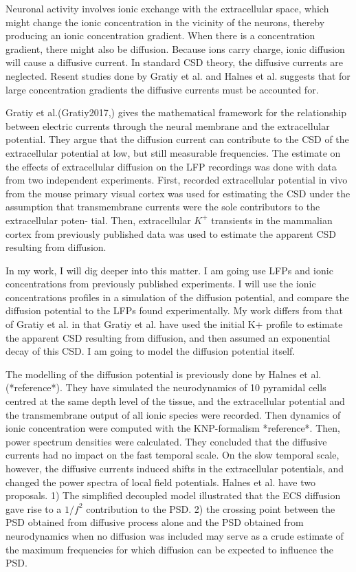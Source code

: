 \documentclass{article}
\begin{document}
Neuronal activity involves ionic exchange with the extracellular space, which might change the ionic concentration in the vicinity of the neurons, thereby producing an ionic concentration gradient. When there is a concentration gradient, there might also be diffusion. Because ions carry charge, ionic diffusion will cause a diffusive current. In standard CSD theory, the diffusive currents are neglected. Resent studies done by Gratiy et al. and Halnes et al. suggests that for large concentration gradients the diffusive currents must be accounted for. 

Gratiy et al.(Gratiy2017,) gives the mathematical framework for the relationship between electric currents through the neural membrane and the extracellular potential. They argue that the diffusion current can contribute to the CSD of the extracellular potential at low, but still measurable frequencies. The estimate on the effects of extracellular diffusion on the LFP recordings was done with data from two independent experiments. First, recorded extracellular potential in vivo from the mouse primary visual cortex was used for estimating the CSD under the assumption that transmembrane currents were the sole contributors to the extracellular poten-
tial. Then, extracellular $K^+$ transients in the mammalian cortex from previously published data was used to estimate the apparent CSD resulting from diffusion. 

In my work, I will dig deeper into this matter. I am going use LFPs and ionic concentrations from previously published experiments. I will use the ionic concentrations profiles in a simulation of the diffusion potential, and compare the diffusion potential to the LFPs found experimentally. My work differs from that of Gratiy et al. in that Gratiy et al. have used the initial K+ profile to estimate the apparent CSD resulting from diffusion, and then assumed an exponential decay of this CSD. I am going to model the diffusion potential itself. 

The modelling of the diffusion potential is previously done by Halnes et al. (*reference*). They have simulated the neurodynamics of 10 pyramidal cells centred at the same depth level of the tissue, and the extracellular potential and the transmembrane output of all ionic species were recorded. Then  dynamics of ionic concentration were computed with the KNP-formalism *reference*. Then, power spectrum densities were calculated. They concluded that the diffusive currents had no impact on the fast temporal scale. On the slow temporal scale, however, the diffusive currents induced shifts in the extracellular potentials, and changed the power spectra of local field potentials. Halnes et al. have two proposals. 1) The simplified decoupled model illustrated that the ECS diffusion gave rise to a $1/f^2$ contribution to the PSD. 2) the crossing point between the PSD obtained from diffusive process alone and the PSD obtained from neurodynamics when no diffusion was included may serve as a crude estimate of the maximum frequencies for which diffusion can be expected to influence the PSD. 
\end{document}
